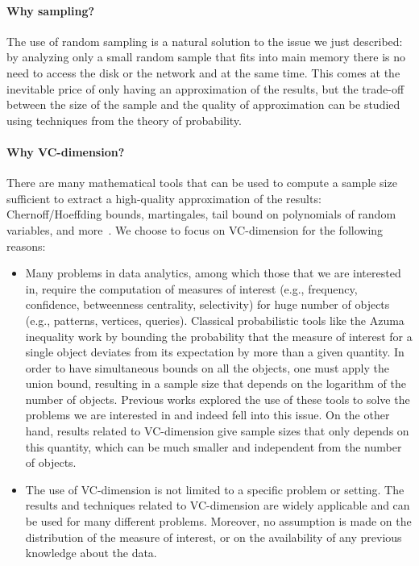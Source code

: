 \paragraph*{Why sampling?} The use of random sampling is a natural solution to
the issue we just described: by analyzing only a small random sample that fits into main
memory there is no need to access the disk or the network and at the same time.
This comes at the inevitable price of only having an approximation of the
results, but the trade-off between the size of the sample and the quality of
approximation can be studied using techniques from the theory of probability.
\paragraph*{Why VC-dimension?} There are many mathematical tools that can be
used to compute a sample size sufficient to extract a high-quality approximation
of the results: Chernoff/Hoeffding bounds, martingales, tail bound on
polynomials of random variables, and
more~\citep{MitzenmacherU05,AlonS08,DubhashiP09}. We choose to focus on
VC-dimension for the following reasons:
\begin{itemize}
  \item Many problems in data analytics, among which those that we are
    interested in, require the computation of measures of interest (e.g.,
    frequency, confidence, betweenness centrality, selectivity) for huge number
    of objects (e.g., patterns, vertices, queries). Classical probabilistic
    tools like the Azuma inequality work by bounding the probability that the
    measure of interest for a single object deviates from its expectation by
    more than a given quantity. In order to have simultaneous bounds on all the
    objects, one must apply the union bound, resulting in a sample size that
    depends on the logarithm of the number of objects. Previous works explored
    the use of these tools to solve the problems we are interested in and indeed
    fell into this issue. On the other hand, results related to VC-dimension
    give sample sizes that only depends on this quantity, which can be much
    smaller and independent from the number of objects.
  \item The use of VC-dimension is not limited to a specific problem or setting.
    The results and techniques related to VC-dimension are widely applicable and
    can be used for many different problems. Moreover, no assumption is made on
    the distribution of the measure of interest, or on the availability of any
    previous knowledge about the data.
\end{itemize}

